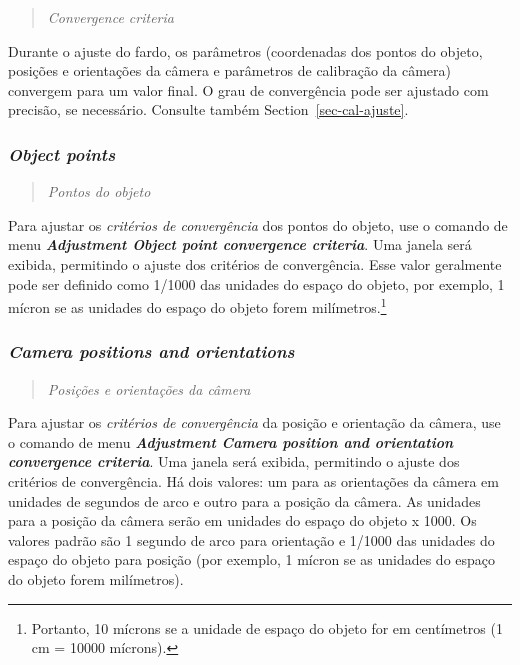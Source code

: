 \documentclass[
  12pt,
  letterpaper,
  DIV=11,
  numbers=noendperiod]{scrreprt}
\begin{document}
\begin{quote}
\emph{Convergence criteria}
\end{quote}

Durante o ajuste do fardo, os parâmetros (coordenadas dos pontos do
objeto, posições e orientações da câmera e parâmetros de calibração da
câmera) convergem para um valor final. O grau de convergência pode ser
ajustado com precisão, se necessário. Consulte também
Section~\ref{sec-cal-ajuste}.

\subsubsection{\texorpdfstring{\emph{Object
points}}{Object points}}\label{object-points}

\begin{quote}
\emph{Pontos do objeto}
\end{quote}

Para ajustar os \emph{critérios de convergência} dos pontos do objeto,
use o comando de menu \textbf{\emph{Adjustment \textbar{} Object point
convergence criteria}}. Uma janela será exibida, permitindo o ajuste dos
critérios de convergência. Esse valor geralmente pode ser definido como
1/1000 das unidades do espaço do objeto, por exemplo, 1 mícron se as
unidades do espaço do objeto forem milímetros.\footnote{Portanto, 10
  mícrons se a unidade de espaço do objeto for em centímetros (1 cm =
  10000 mícrons).}

\subsubsection{\texorpdfstring{\emph{Camera positions and
orientations}}{Camera positions and orientations}}\label{camera-positions-and-orientations}

\begin{quote}
\emph{Posições e orientações da câmera}
\end{quote}

Para ajustar os \emph{critérios de convergência} da posição e orientação
da câmera, use o comando de menu \textbf{\emph{Adjustment \textbar{}
Camera position and orientation convergence criteria}}. Uma janela será
exibida, permitindo o ajuste dos critérios de convergência. Há dois
valores: um para as orientações da câmera em unidades de segundos de
arco e outro para a posição da câmera. As unidades para a posição da
câmera serão em unidades do espaço do objeto x 1000. Os valores padrão
são 1 segundo de arco para orientação e 1/1000 das unidades do espaço do
objeto para posição (por exemplo, 1 mícron se as unidades do espaço do
objeto forem milímetros).
\end{document}
